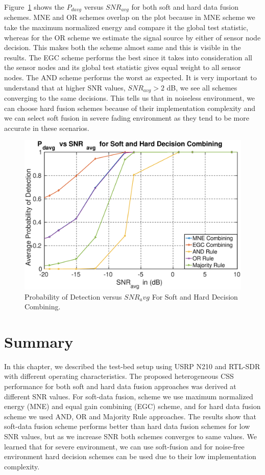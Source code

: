 Figure~\ref{softpd} shows the $P_{davg}$ versus $SNR_{avg}$ for both soft and hard data fusion schemes. MNE and OR schemes overlap on the plot because in MNE scheme we take the maximum normalized energy and compare it the global test statistic, whereas for the OR scheme we estimate the signal source by either of sensor node decision. This makes both the scheme almost same and this is visible in the results. The EGC scheme performs the best since it takes into consideration all the sensor nodes and its global test statistic gives equal weight to all sensor nodes. The AND scheme performs the worst as expected. It is very important to understand that at higher SNR values, $SNR_{avg} > 2$ dB, we see all schemes converging to the same decisions. This tells us that in noiseless environment, we can choose hard fusion schemes because of their implementation complexity and we can select soft fusion in severe fading environment as they tend to be more accurate in these scenarios.
\begin{figure}[ht!]
	\centering
	\includegraphics[width=\textwidth,keepaspectratio]{images/Gill/figs/softnhardecisionpd.eps}
    \caption{Probability of Detection versus $SNR_avg$ For Soft and Hard Decision Combining.} 
\label{softpd}      
\end{figure}

\section{Summary}
In this chapter, we described the test-bed setup using USRP N210 and RTL-SDR with different operating characteristics. The proposed heterogeneous CSS performance for both soft and hard data fusion approaches was derived at different SNR values. For soft-data fusion, scheme we use maximum normalized energy (MNE) and equal gain combining (EGC) scheme, and for hard data fusion scheme we used AND, OR and Majority Rule approaches. The results show that soft-data fusion scheme performs better than hard data fusion schemes for low SNR values, but as we increase SNR both schemes converges to same values. We learned that for severe environment, we can use soft-fusion and for noise-free environment hard decision schemes can be used due to their low implementation complexity.
